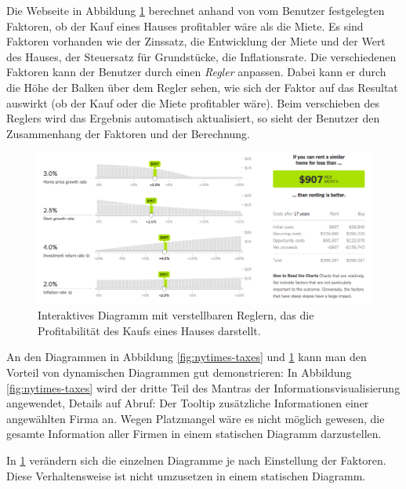Die Webseite in Abbildung \ref{fig:nytimes-realestate} berechnet anhand von vom Benutzer festgelegten Faktoren, ob der Kauf eines Hauses profitabler wäre als die Miete. Es sind Faktoren vorhanden wie der Zinssatz, die Entwicklung der Miete und der Wert des Hauses, der Steuersatz für Grundstücke, die Inflationsrate. Die verschiedenen Faktoren kann der Benutzer durch einen \textit{Regler} anpassen. Dabei kann er durch die Höhe der Balken über dem Regler sehen, wie sich der Faktor auf das Resultat auswirkt (ob der Kauf oder die Miete profitabler wäre). Beim verschieben des Reglers wird das Ergebnis automatisch aktualisiert, so sieht der Benutzer den Zusammenhang der Faktoren und der Berechnung.

\begin{figure}[!htbp]
	\centering
	\includegraphics[width=\linewidth]{images/nytimes-realestate-zugeschnitten}
	\caption[Interaktives Diagramm in The New York Times ()]{Interaktives Diagramm mit verstellbaren Reglern, das die Profitabilität des Kaufs eines Hauses darstellt. \cite{nytimes-realestate}}
	\label{fig:nytimes-realestate}
\end{figure}


An den Diagrammen in Abbildung \ref{fig:nytimes-taxes} und \ref{fig:nytimes-realestate} kann man den Vorteil von dynamischen Diagrammen gut demonstrieren: In Abbildung \ref{fig:nytimes-taxes} wird der dritte Teil des Mantras der Informationsvisualisierung angewendet, Details auf Abruf: Der Tooltip zusätzliche Informationen einer angewählten Firma an. Wegen Platzmangel wäre es nicht möglich gewesen, die gesamte Information aller Firmen in einem statischen Diagramm darzustellen.

In \ref{fig:nytimes-realestate} verändern sich die einzelnen Diagramme je nach Einstellung der Faktoren. Diese Verhaltensweise ist nicht umzusetzen in einem statischen Diagramm.

